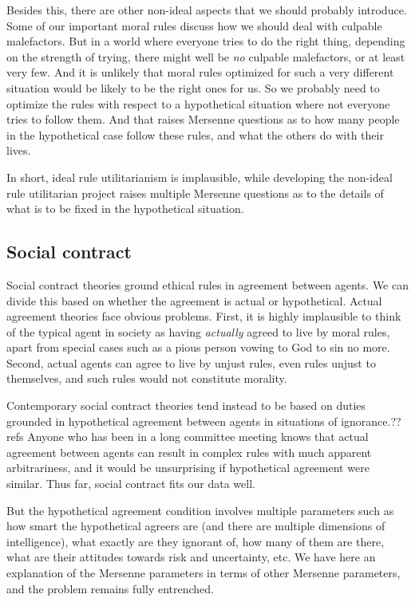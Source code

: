 Besides this, there are other non-ideal aspects that we should probably introduce. Some of our important moral rules discuss how
we should deal with culpable malefactors. But in a world where everyone tries to do the right thing, depending on the strength
of trying, there might well be \textit{no} culpable malefactors, or at least very few. And it is unlikely that moral rules optimized
for such a very different situation would be likely to be the right ones for us. So we probably need to optimize the rules with
respect to a hypothetical situation where not everyone tries to follow them. And that raises Mersenne questions as to how many
people in the hypothetical case follow these rules, and what the others do with their lives. 

In short, ideal rule utilitarianism is implausible, while developing the non-ideal rule utilitarian project raises multiple
Mersenne questions as to the details of what is to be fixed in the hypothetical situation.

\subsection{Social contract}
Social contract theories ground ethical rules in agreement between agents.  We can divide this based on whether the agreement 
is actual or hypothetical. Actual agreement theories face obvious problems. First, it is highly implausible to think of the
typical agent in society as having \textit{actually} agreed to live by moral rules, apart from special cases such as a pious
person vowing to God to sin no more. Second, actual agents can agree to live by unjust rules, even rules unjust to themselves,
and such rules would not constitute morality. 

Contemporary social contract theories tend instead to be based on duties grounded in hypothetical agreement between agents in situations of 
ignorance.??refs Anyone who has been in a long committee meeting knows that actual agreement between agents can result in 
complex rules with much apparent arbitrariness, and it would be unsurprising if hypothetical agreement were similar. Thus far, 
social contract fits our data well. 

But the hypothetical agreement condition involves multiple parameters such as how smart the hypothetical agreers are (and there are
multiple dimensions of intelligence), what exactly are they ignorant of, how many of them are there, what are their attitudes towards
risk and uncertainty, etc. 
We have here an explanation of the Mersenne parameters in terms of other Mersenne parameters, and the
problem remains fully entrenched. 


